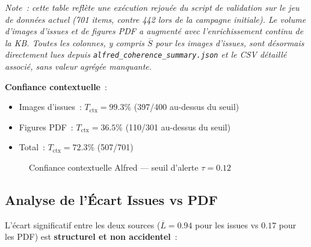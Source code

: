 \textit{\footnotesize Note~: cette table reflète une exécution rejouée du script de validation sur le jeu de données actuel (701 items, contre 442 lors de la campagne initiale). Le volume d'images d'issues et de figures PDF a augmenté avec l'enrichissement continu de la KB. Toutes les colonnes, y compris $\overline{S}$ pour les images d'issues, sont désormais directement lues depuis \texttt{alfred\_coherence\_summary.json} et le CSV détaillé associé, sans valeur agrégée manquante.}\par\smallskip

\textbf{Confiance contextuelle}~:
\begin{itemize}
  \item Images d'issues~: $T_{\text{ctx}} = 99.3\%$ (397/400 au-dessus du seuil)
  \item Figures PDF~: $T_{\text{ctx}} = 36.5\%$ (110/301 au-dessus du seuil)
  \item Total~: $T_{\text{ctx}} = 72.3\%$ (507/701)
\end{itemize}

\begin{figure}[H]
\centering
{}
\caption{Confiance contextuelle Alfred --- seuil d'alerte $\tau = 0.12$}
\label{fig:alfred_trust_chart}
\end{figure}

\subsection{Analyse de l'Écart Issues vs PDF}
\label{sec:alfred_analyse_ecart}

L'écart significatif entre les deux sources ($\overline{L} = 0.94$ pour les issues vs $0.17$ pour les PDF) est \textbf{structurel et non accidentel}~:

